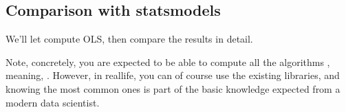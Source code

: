 \documentclass[letterpaper,10pt,english]{jupyterBook}
\begin{document}
\subsection{Comparison with statsmodels}
\label{\detokenize{02:comparison-with-statsmodels}}
\sphinxAtStartPar
We’ll let  compute OLS, then compare the results in detail.

\begin{sphinxShadowBox}
\sphinxstylesidebartitle{}

\sphinxAtStartPar
Note, concretely, you are expected to be able to compute all the algorithms , meaning, . However, in real\sphinxhyphen{}life, you can of course use the existing libraries, and knowing the most common ones is part of the basic knowledge expected from a modern data scientist.
\end{sphinxShadowBox}
\end{document}
